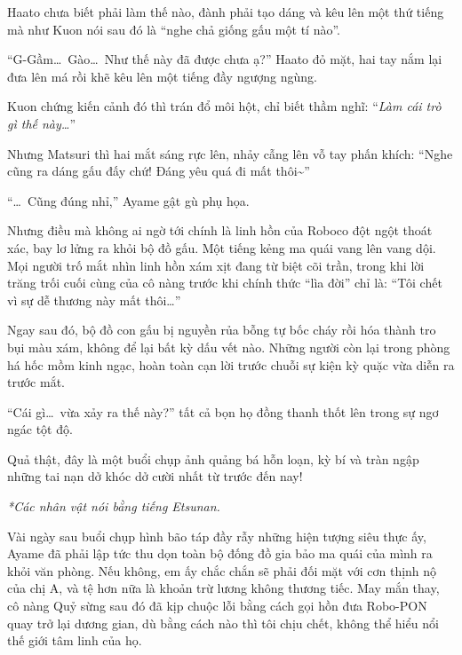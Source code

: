 \documentclass[../main.tex]{subfiles}
\begin{document}
Haato chưa biết phải làm thế nào, đành phải tạo dáng và kêu lên một thứ tiếng mà như Kuon nói sau đó là ``nghe chả giống gấu một tí nào''.


``G-Gầm\dots\ Gào\dots\ Như thế này đã được chưa ạ?'' Haato đỏ mặt, hai tay nắm lại đưa lên má rồi khẽ kêu lên một tiếng đầy ngượng ngùng.

Kuon chứng kiến cảnh đó thì trán đổ môi hột, chỉ biết thầm nghĩ: ``\textit{Làm cái trò gì thế này\dots}''

Nhưng Matsuri thì hai mắt sáng rực lên, nhảy cẫng lên vỗ tay phấn khích: ``Nghe cũng ra dáng gấu đấy chứ! Đáng yêu quá đi mất thôi\~{}''

``\dots\ Cũng đúng nhỉ,'' Ayame gật gù phụ họa.


Nhưng điều mà không ai ngờ tới chính là linh hồn của Roboco đột ngột thoát xác, bay lơ lửng ra khỏi bộ đồ gấu. Một tiếng kẻng ma quái vang lên vang dội. Mọi người trố mắt nhìn linh hồn xám xịt đang từ biệt cõi trần, trong khi lời trăng trối cuối cùng của cô nàng trước khi chính thức ``lìa đời'' chỉ là: ``Tôi chết vì sự dễ thương này mất thôi\dots''

Ngay sau đó, bộ đồ con gấu bị nguyền rủa bỗng tự bốc cháy rồi hóa thành tro bụi màu xám, không để lại bất kỳ dấu vết nào. Những người còn lại trong phòng há hốc mồm kinh ngạc, hoàn toàn cạn lời trước chuỗi sự kiện kỳ quặc vừa diễn ra trước mắt.

``Cái gì\dots\ vừa xảy ra thế này?'' tất cả bọn họ đồng thanh thốt lên trong sự ngơ ngác tột độ.

Quả thật, đây là một buổi chụp ảnh quảng bá hỗn loạn, kỳ bí và tràn ngập những tai nạn dở khóc dở cười nhất từ trước đến nay!

\omk

\begin{center}
  {\textit{*Các nhân vật nói bằng tiếng Etsunan.}}
\end{center}


Vài ngày sau buổi chụp hình bão táp đầy rẫy những hiện tượng siêu thực ấy, Ayame đã phải lập tức thu dọn toàn bộ đống đồ gia bảo ma quái của mình ra khỏi văn phòng. Nếu không, em ấy chắc chắn sẽ phải đối mặt với cơn thịnh nộ của chị A, và tệ hơn nữa là khoản trừ lương không thương tiếc. May mắn thay, cô nàng Quỷ sừng sau đó đã kịp chuộc lỗi bằng cách gọi hồn đưa Robo-PON quay trở lại dương gian, dù bằng cách nào thì tôi chịu chết, không thể hiểu nổi thế giới tâm linh của họ.
\end{document}
